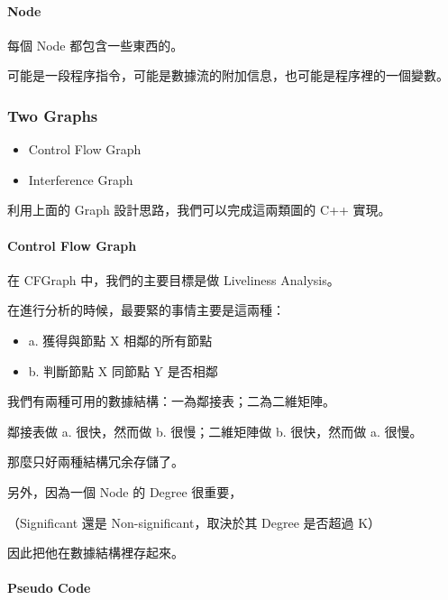 \documentclass[
]{article}
\begin{document}
\hypertarget{header-n66}{%
\paragraph{Node}\label{header-n66}}

每個 Node 都包含一些東西的。

可能是一段程序指令，可能是數據流的附加信息，也可能是程序裡的一個變數。

\hypertarget{header-n69}{%
\subsubsection{Two Graphs}\label{header-n69}}

\begin{itemize}
\item
  Control Flow Graph
\item
  Interference Graph
\end{itemize}

利用上面的 Graph 設計思路，我們可以完成這兩類圖的 C++ 實現。

\hypertarget{header-n76}{%
\paragraph{Control Flow Graph}\label{header-n76}}

在 CFGraph 中，我們的主要目標是做 Liveliness Analysis。

在進行分析的時候，最要緊的事情主要是這兩種：

\begin{itemize}
\item
  a. 獲得與節點 X 相鄰的所有節點
\item
  b. 判斷節點 X 同節點 Y 是否相鄰
\end{itemize}

我們有兩種可用的數據結構：一為鄰接表；二為二維矩陣。

鄰接表做 a. 很快，然而做 b. 很慢；二維矩陣做 b. 很快，然而做 a. 很慢。

那麼只好兩種結構冗余存儲了。

另外，因為一個 Node 的 Degree 很重要，

（Significant 還是 Non-significant，取決於其 Degree 是否超過 K）

因此把他在數據結構裡存起來。

\hypertarget{header-n90}{%
\paragraph{Pseudo Code}\label{header-n90}}
\end{document}
